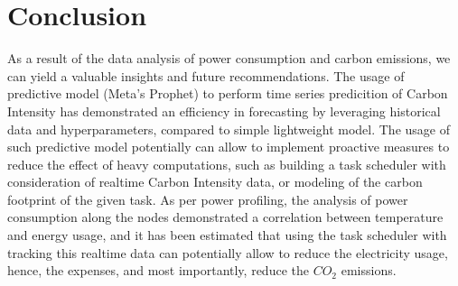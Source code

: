 \section{Conclusion}
\noindent

As a result of the data analysis of power consumption and carbon emissions, we can yield a valuable insights and future recommendations.
The usage of predictive model (Meta’s Prophet) to perform time series predicition of Carbon Intensity has demonstrated an efficiency in forecasting by leveraging historical data and hyperparameters, compared to simple lightweight model.
The usage of such predictive model potentially can allow to implement proactive measures to reduce the effect of heavy computations, such as building a task scheduler with consideration of realtime Carbon Intensity data, or modeling of the carbon footprint of the given task.
As per power profiling, the analysis of power consumption along the nodes demonstrated a correlation between temperature and energy usage, and it has been estimated that using the task scheduler with tracking this realtime data  can potentially allow to reduce the electricity usage, hence, the expenses, and most importantly, reduce the $CO_2$ emissions.